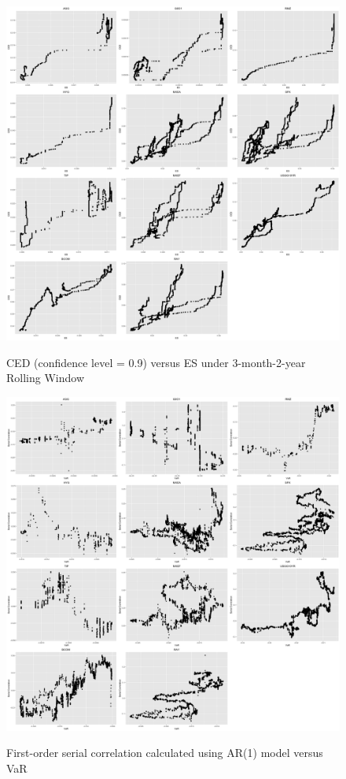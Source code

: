 \documentclass[12pt]{article}
\begin{document}
\begin{figure}[h]
\caption{CED (confidence level = 0.9) versus ES under 3-month-2-year Rolling Window} 
\centering 
\includegraphics[width=15cm]{../results/CED_ES_3mon_5yr5yr}
\label{fig: CED_ES_3mon_5yr5yr}
\end{figure}

\begin{figure}
  \caption{First-order serial correlation calculated using AR(1) model versus VaR}
  \includegraphics[width = 1\textwidth]{../results/SerCol-VaR5yrAR1}
  \label{fig:SerCol-VaR5yrAR1}
\end{figure}
\end{document}
